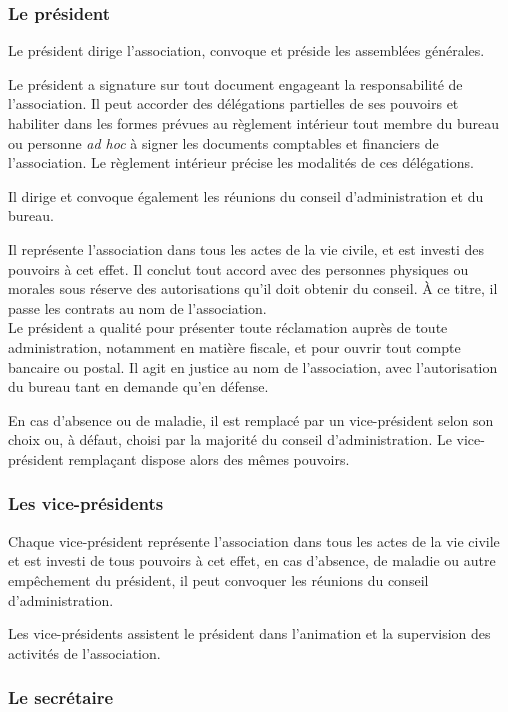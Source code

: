 \documentclass[a4wide,12pt]{scrartcl}
\begin{document}
\subsubsection*{Le président}

Le président dirige l'association, convoque et préside les assemblées
générales.

Le président a signature sur tout document engageant la responsabilité
de l'association. Il peut accorder des délégations partielles de ses
pouvoirs et habiliter dans les formes prévues au règlement intérieur
tout membre du bureau ou personne \textit{ad hoc} à signer les documents
comptables et financiers de l'association. Le règlement intérieur
précise les modalités de ces délégations.

Il dirige et convoque également les réunions du conseil
d'administration et du bureau.

Il représente l'association dans tous les actes de la vie civile, et
est investi des pouvoirs à cet effet. Il conclut tout accord avec des
personnes physiques ou morales sous réserve des autorisations qu'il
doit obtenir du conseil. À ce titre, il passe les contrats au nom de
l'association.\\
Le président a qualité pour présenter toute réclamation
auprès de toute administration, notamment en matière fiscale, et pour
ouvrir tout compte bancaire ou postal. Il agit en justice au nom de
l'association, avec l'autorisation du bureau tant en demande qu'en
défense.
 
En cas d'absence ou de maladie, il est remplacé par un vice-président
selon son choix ou, à défaut, choisi par la majorité du conseil
d'administration. Le vice-président remplaçant dispose alors des
mêmes pouvoirs.

\subsubsection*{Les vice-présidents}

Chaque vice-président représente l'association dans tous les actes de
la vie civile et est investi de tous pouvoirs à cet effet, en cas
d'absence, de maladie ou autre empêchement du président, il peut
convoquer les réunions du conseil d'administration.

Les vice-présidents assistent le président dans l'animation et la
supervision des activités de l'association.

\subsubsection*{Le secrétaire}
\end{document}
